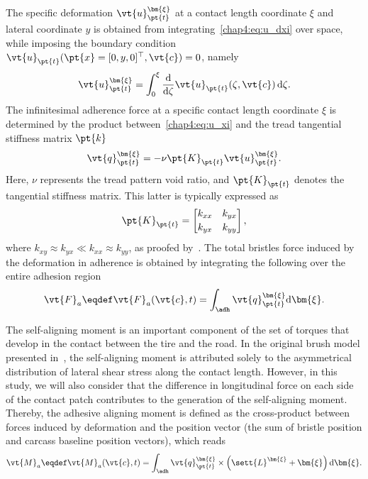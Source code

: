 %
The specific deformation $\vt{u}_{\pt{t}}^{\bm{\xi}}$ at a contact length coordinate $\xi$ and lateral coordinate $y$ is obtained from integrating~\eqref{chap4:eq:u_dxi} over space, while imposing the boundary condition $\vt{u}_{\pt{t}}(\pt{x} = [0,y,0]^\top,\vt{c}) = 0$, namely
%
\begin{equation}
  \vt{u}_{\pt{t}}^{\bm{\xi}} = \int_0^\xi \dfrac{\mathrm{d}}{\mathrm{d}\zeta}\vt{u}_{\pt{t}}(\zeta,\vt{c}) \,\mathrm{d}\zeta.
  \label{chap4:eq:u_xi}
\end{equation}
%
The infinitesimal adherence force at a specific contact length coordinate $\xi$ is determined by the product between~\eqref{chap4:eq:u_xi} and the tread tangential stiffness matrix $\pt{k}$
%
\begin{equation}
  \vt{q}_{\pt{t}}^{\bm{\xi}} = -\nu\pt{K}_{\pt{t}}\vt{u}_{\pt{t}}^{\bm{\xi}}.
  \label{chap4:eq:fa}
\end{equation}
%
Here, $\nu$ represents the tread pattern void ratio, and $\pt{K}_{\pt{t}}$ denotes the tangential stiffness matrix. This latter is typically expressed as
%
\begin{equation}
  \pt{K}_{\pt{t}} =
  \begin{bmatrix}
    k_{xx} & k_{yx} \\[0.2em]
    k_{yx} & k_{yy}
  \end{bmatrix},
\end{equation}
%
where $k_{xy} \approx k_{yx} \ll k_{xx} \approx k_{yy}$, as proofed by~\citet{okonieski2003simpified}. The total bristles force induced by the deformation in adherence is obtained by integrating the following over the entire adhesion region \adh{}
%
\begin{equation}
  \vt{F}_a \eqdef \vt{F}_a(\vt{c},t) = \int_{\adh} \vt{q}_{\pt{t}}^{\bm{\xi}} \mathrm{d}\bm{\xi}.
  \label{chap4:eq:fsint_adv}
\end{equation}

The self-aligning moment is an important component of the set of torques that develop in the contact between the tire and the road. In the original brush model presented in~\cite{pacejka2012tire}, the self-aligning moment is attributed solely to the asymmetrical distribution of lateral shear stress along the contact length. However, in this study, we will also consider that the difference in longitudinal force on each side of the contact patch contributes to the generation of the self-aligning moment. Thereby, the adhesive aligning moment is defined as the cross-product between forces induced by deformation and the position vector (the sum of bristle position and carcass baseline position vectors), which reads
%
\begin{equation}
  \vt{M}_{a} \eqdef \vt{M}_{a}(\vt{c},t) = \int_{\adh} \vt{q}_{\pt{t}}^{\bm{\xi}} \times \left(\sett{L}^{\bm{\xi}} + \bm{\xi}\right) \mathrm{d}\bm{\xi}.
  \label{chap4:eq:M_a}
\end{equation}

